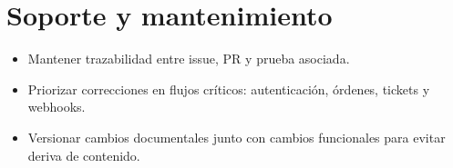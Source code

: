 \documentclass[
  11pt,
  a4paper,
  twoside=false,
  parskip=half               %
]{scrreprt}                  %
\providecommand{\tightlist}{%
  \setlength{\itemsep}{0pt}\setlength{\parskip}{0pt}}
\begin{document}
\hypertarget{soporte-y-mantenimiento}{%
\section{Soporte y mantenimiento}\label{soporte-y-mantenimiento}}

\begin{itemize}
\tightlist
\item
  Mantener trazabilidad entre issue, PR y prueba asociada.
\item
  Priorizar correcciones en flujos críticos: autenticación, órdenes,
  tickets y webhooks.
\item
  Versionar cambios documentales junto con cambios funcionales para
  evitar deriva de contenido.
\end{itemize}
\end{document}
